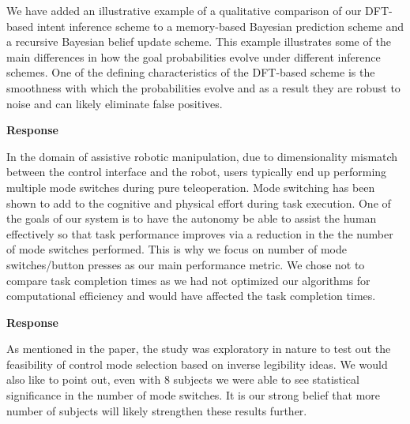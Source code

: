 \documentclass[a4paper,twoside,11pt]{reviewresponse}
\begin{document}
We have added an illustrative example of a qualitative comparison of our DFT-based intent inference scheme to a memory-based Bayesian prediction scheme and a recursive Bayesian belief update scheme. This example illustrates some of the main differences in how the goal probabilities evolve under different inference schemes. One of the defining characteristics of the DFT-based scheme is the smoothness with which the probabilities evolve and as a result they are robust to noise and can likely eliminate false positives. 

\textbf{Response}

In the domain of assistive robotic manipulation, due to dimensionality mismatch between the control interface and the robot, users typically end up performing multiple mode switches during pure teleoperation. Mode switching has been shown to add to the cognitive and physical effort during task execution. One of the goals of our system is to have the autonomy be able to assist the human effectively so that task performance improves via a reduction in the the number of mode switches performed. This is why we focus on number of mode switches/button presses as our main performance metric. We chose not to compare task completion times as we had not optimized our algorithms for computational efficiency and would have affected the task completion times. 


\textbf{Response}

As mentioned in the paper, the study was exploratory in nature to test out the feasibility of control mode selection based on inverse legibility ideas. We would also like to point out, even with 8 subjects we were able to see statistical significance in the number of mode switches. It is our strong belief that more number of subjects will likely strengthen these results further. 

%
%
\end{document}
